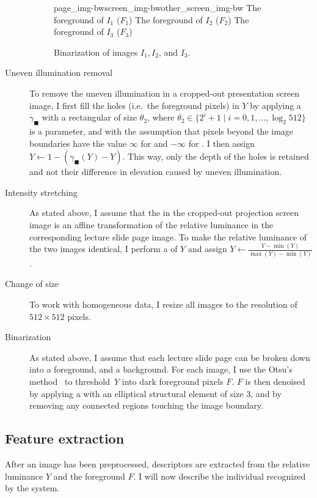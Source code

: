 \begin{description}
\begin{figure}
    \kern\floatsep
      {page_img-bw}{screen_img-bw}{other_screen_img-bw}%
      {The foreground of $I_1$ ($F_1$)}%
      {The foreground of $I_2$ ($F_2$)}%
      {The foreground of $I_3$ ($F_3$)}
    \caption{Binarization of images $I_1,I_2$, and $I_3$.}
    \label{fig:preprocessing-last}
  \end{figure}
  \item[Uneven illumination removal]
    To remove the uneven illumination in a cropped-out presentation screen
    image, I first fill the holes (i.e.\ the foreground pixels) in $Y$ by
    applying a  $\gamma_\blacksquare$ with a
    rectangular  of size $\theta_2$, where
    $\theta_2\in\{2^i+1\mid i=0,1,\ldots,\log_2 512\}$
    is a parameter, and with the assumption that pixels beyond the image
    boundaries have the value $\infty$ for  and
    $-\infty$ for . I then assign $Y\leftarrow
    1-(\gamma_\blacksquare(Y)-Y)$.  This way, only the depth of the holes is retained and
    not their difference in elevation caused by uneven illumination.
  \item[Intensity stretching]
    As stated above, I assume that the  in the
    cropped-out projection screen image is an affine transformation of the
    relative luminance in the corresponding lecture slide page image. To make
    the relative luminance of the two images identical, I perform a
     of $Y$ and assign
    $Y\leftarrow\frac{Y-\min(Y)}{\max(Y)-\min(Y)}$.
  \item[Change of size]
    To work with homogeneous data, I resize all images to the resolution of
    $512\times 512$ pixels.
  \item[Binarization]
    As stated above, I assume that each lecture slide page can be broken down
    into a foreground, and a background. For each image, I use
    the Otsu's method~\cite{otsu1979threshold} to threshold~$Y$ into dark
    foreground pixels $F$. $F$ is then denoised by applying a
     with an elliptical
    structural element of size 3, and by removing any connected regions
    touching the image boundary.
\end{description}

\subsection{Feature extraction}
\label{sec:features}
After an image has been preprocessed, descriptors are extracted from the
relative luminance $Y$ and the foreground $F$. I will now describe the
individual  recognized by the system.

